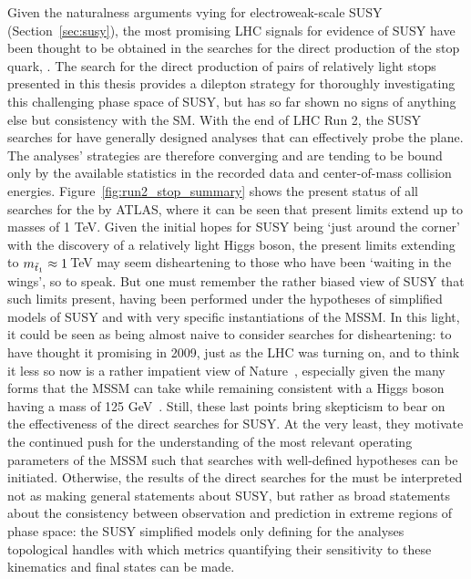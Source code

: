 %
%

Given the naturalness arguments vying for electroweak-scale SUSY (Section~\ref{sec:susy}),
the most promising LHC signals for evidence of SUSY have been thought to be obtained in the searches for the direct production
of the stop quark, \stopone.
The search for the direct production of pairs of relatively light stops presented in this thesis provides a dilepton
strategy for thoroughly investigating this challenging phase space of SUSY, but has so far shown no signs of anything else
but consistency with the SM.
With the end of LHC Run 2, the SUSY searches for \stopone have generally designed analyses that can effectively
probe the \msn plane.
The analyses' strategies are therefore converging and are tending to be bound only by the available statistics
in the recorded data and center-of-mass collision energies.
Figure~\ref{fig:run2_stop_summary} shows the present status of all searches for the \stopone by ATLAS,
where it can be seen that present limits extend up to \stopone masses of 1 TeV.
Given the initial hopes for SUSY being `just around the corner' with the discovery of a relatively light Higgs boson,
the present limits extending to $m_{\tilde{t}_1} \approx 1$\,TeV may seem disheartening to those who
have been `waiting in the wings', so to speak.
But one must remember the rather biased view of SUSY that such limits present, having been performed
under the hypotheses of simplified models of SUSY and with very specific instantiations of the MSSM.
In this light, it could be seen as being almost naive to consider searches for \stopone disheartening:
to have thought it promising in 2009, just as the LHC was turning on, and to think it less so now
is a rather impatient view of Nature~\cite{FengNaturalness}, especially given the many forms that the MSSM
can take while remaining consistent with a Higgs boson having a mass of 125 GeV~\cite{SUSYPrimer}.
Still, these last points bring skepticism to bear on the effectiveness of the direct searches for SUSY.
At the very least, they motivate the continued push for the understanding of the most relevant
operating parameters of the MSSM such that searches with well-defined hypotheses can
be initiated.
Otherwise, the results of the direct searches for the \stopone must be interpreted not as making general statements
about SUSY, but rather as broad statements about the consistency between observation and prediction in extreme regions of phase space:
the SUSY simplified models only defining for the analyses topological handles with which metrics
quantifying their sensitivity to these kinematics and final states can be made.

